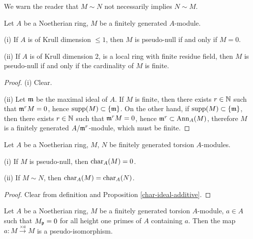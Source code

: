 \begin{remark}
We warn the reader that $M\sim N$ not necessarily implies $N\sim M$.
\end{remark}

\begin{prop}
\label{pseudo-null-criterion}
\leanok
Let $A$ be a Noetherian ring, $M$ be a finitely generated $A$-module.

{\rm(i)} If $A$ is of Krull dimension $\leq 1$, then $M$ is pseudo-null
if and only if $M=0$.

{\rm(ii)} If $A$ is of Krull dimension $2$,
is a local ring with finite residue field, then $M$ is pseudo-null
if and only if the cardinality of $M$ is finite.
\end{prop}

\begin{proof}
\leanok
(i) Clear.

(ii) Let ${\mathfrak{m}}$ be the maximal ideal of $A$.
If $M$ is finite, then there exists $r\in{\mathbb {N}}$
such that ${\mathfrak{m}}^rM=0$, hence ${\mathrm{supp}}(M)\subset\{{\mathfrak{m}}\}$.
On the other hand, if ${\mathrm{supp}}(M)\subset\{{\mathfrak{m}}\}$,
then there exists $r\in{\mathbb {N}}$
such that ${\mathfrak{m}}^rM=0$, hence ${\mathfrak{m}}^r\subset{\mathrm{Ann}}_A(M)$, therefore
$M$ is a finitely generated $A/{\mathfrak{m}}^r$-module, which must be finite.
\end{proof}

\begin{prop}
\label{pseudo-null-char-ideal}
\leanok
Let $A$ be a Noetherian ring, $M$, $N$ be finitely generated torsion $A$-modules.

{\rm(i)} If $M$ is pseudo-null, then $\operatorname{char}_A(M)=0$.

{\rm(ii)} If $M\sim N$, then $\operatorname{char}_A(M)=\operatorname{char}_A(N)$.
\end{prop}

\begin{proof}
\leanok
Clear from definition and Proposition \ref{char-ideal-additive}.
\end{proof}

\begin{prop}
\label{smul-is-pis}
\leanok
Let $A$ be a Noetherian ring, $M$ be a finitely generated torsion $A$-module,
$a\in A$ such that $M_{\mathfrak{p}}=0$ for all height one primes of $A$ containing $a$.
Then the map $a:M\xrightarrow{\times a}M$ is a pseudo-isomorphism.
\end{prop}

